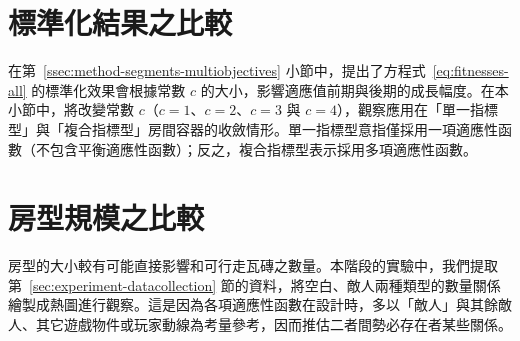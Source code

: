 \section{標準化結果之比較}
\label{sec:experiment-normalized}

在第~\ref{ssec:method-segments-multiobjectives} 小節中，提出了方程式~\ref{eq:fitnesses-all} 的標準化效果會根據常數 $c$ 的大小，影響適應值前期與後期的成長幅度。在本小節中，將改變常數 $c$（$c = 1$、$c = 2$、$c = 3$ 與 $c = 4$），觀察應用在「單一指標型」與「複合指標型」房間容器的收斂情形。單一指標型意指僅採用一項適應性函數（不包含平衡適應性函數）；反之，複合指標型表示採用多項適應性函數。







\section{房型規模之比較}
\label{sec:experiment-density}

房型的大小較有可能直接影響和可行走瓦磚之數量。本階段的實驗中，我們提取第~\ref{sec:experiment-datacollection} 節的資料，將空白、敵人兩種類型的數量關係繪製成熱圖進行觀察。這是因為各項適應性函數在設計時，多以「敵人」與其餘敵人、其它遊戲物件或玩家動線為考量參考，因而推估二者間勢必存在者某些關係。





